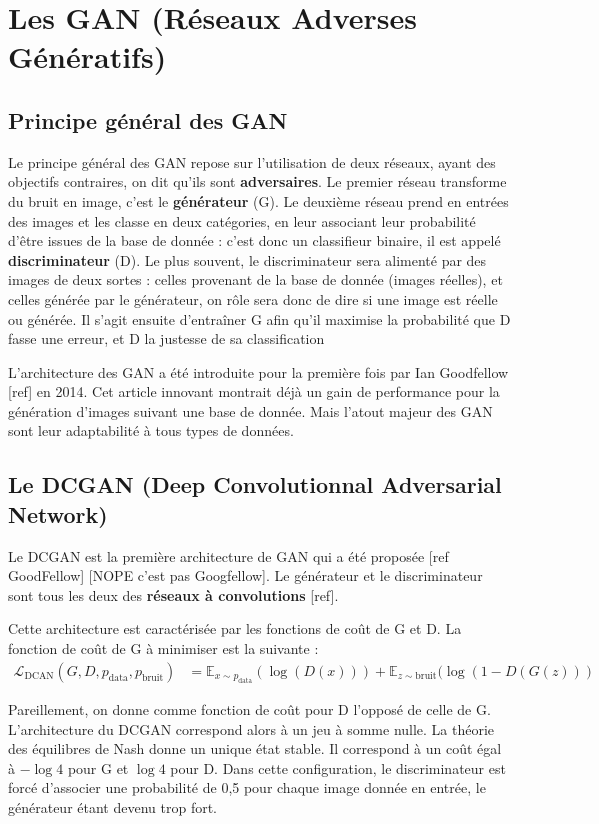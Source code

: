 \chapter{Les GAN (Réseaux Adverses Génératifs)}

\section{Principe général des GAN}
Le principe général des GAN repose sur l'utilisation de deux réseaux, ayant des objectifs contraires, on dit qu'ils sont \textbf{adversaires}. Le premier réseau transforme du bruit en image, c'est le \textbf{générateur} (G). Le deuxième réseau prend en entrées des images et les classe en deux catégories, en leur associant leur probabilité d'être issues de la base de donnée : c'est donc un classifieur binaire, il est appelé \textbf{discriminateur} (D). Le plus souvent, le discriminateur sera alimenté par des images de deux sortes : celles provenant de la base de donnée (images réelles), et celles générée par le générateur, on rôle sera donc de dire si une image est réelle ou générée. Il s'agit ensuite d'entraîner G afin qu'il maximise la probabilité que D fasse une erreur, et D la justesse de sa classification

L'architecture des GAN a été introduite pour la première fois par Ian Goodfellow [ref] en 2014. Cet article innovant montrait déjà un gain de performance pour la génération d'images suivant une base de donnée. Mais l'atout majeur des GAN sont leur adaptabilité à tous types de données.


\section{Le DCGAN (Deep Convolutionnal Adversarial Network)}
Le DCGAN est la première architecture de GAN qui a été proposée [ref GoodFellow] [NOPE c'est pas Googfellow]. Le générateur et le discriminateur sont tous les deux des \textbf{réseaux à convolutions} [ref].

Cette architecture est caractérisée par les fonctions de coût de G et D. La fonction de coût de G à minimiser est la suivante : $$\begin{aligned}
\mathcal{L}_{\mathrm{DCAN}}\left(G, D, p_{\mathrm{data}}, p_{\mathrm{bruit}}\right) &=
   \mathbb{E}_{x \sim p_{\mathrm{data}}}(\log (D(x))) + \mathbb{E}_{z \sim \mathrm{bruit}}(\log (1 - D(G(z)))
\end{aligned}$$

Pareillement, on donne comme fonction de coût pour D l'opposé de celle de G. L'architecture du DCGAN correspond alors à un jeu à somme nulle. La théorie des équilibres de Nash donne un unique état stable. Il correspond à un coût égal à $-\log 4$ pour G et $ \log 4$ pour D. Dans cette configuration, le discriminateur est forcé d'associer une probabilité de 0,5 pour chaque image donnée en entrée, le générateur étant devenu trop fort.

